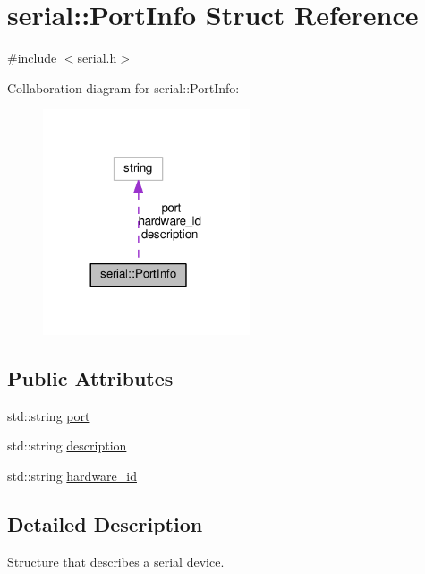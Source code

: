\hypertarget{structserial_1_1_port_info}{}\section{serial\+:\+:Port\+Info Struct Reference}
\label{structserial_1_1_port_info}


{\ttfamily \#include $<$serial.\+h$>$}



Collaboration diagram for serial\+:\+:Port\+Info\+:
\nopagebreak
\begin{figure}[H]
\begin{center}
\leavevmode
\includegraphics[width=173pt]{structserial_1_1_port_info__coll__graph}
\end{center}
\end{figure}
\subsection*{Public Attributes}
\begin{DoxyCompactItemize}
\item 
std\+::string \hyperlink{structserial_1_1_port_info_a5d4242cdd6c0d01260e24964af4c23d2}{port}
\item 
std\+::string \hyperlink{structserial_1_1_port_info_a2ba37dd33d47b554aef5c15c1fe8b872}{description}
\item 
std\+::string \hyperlink{structserial_1_1_port_info_a7d55368e1a4e6ccc9da6f4d339524837}{hardware\+\_\+id}
\end{DoxyCompactItemize}


\subsection{Detailed Description}
Structure that describes a serial device. 

